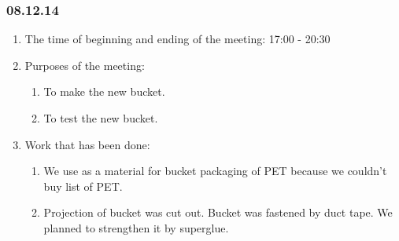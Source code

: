 \subsubsection{08.12.14}

\begin{enumerate}
	\item The time of beginning and ending of the meeting:
	17:00 - 20:30
	\item Purposes of the meeting:
	\begin{enumerate}
	  \item To make the new bucket.
	  
	  \item To test the new bucket.
	  
    \end{enumerate}
	\item Work that has been done:
	\begin{enumerate}
	  \item We use as a material for bucket packaging of PET because we couldn't buy list of PET.
	  
	  \item Projection of bucket was cut out. Bucket was fastened by duct tape. We planned to strengthen it by superglue.
	  

\end{enumerate}
\end{enumerate}
